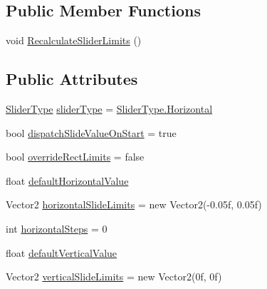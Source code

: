 \subsection*{Public Member Functions}
\begin{DoxyCompactItemize}
\item 
void \mbox{\hyperlink{class_leap_1_1_unity_1_1_interaction_1_1_interaction_slider_af984b10c1e7d956a61505d1294ab28e4}{Recalculate\+Slider\+Limits}} ()
\end{DoxyCompactItemize}
\subsection*{Public Attributes}
\begin{DoxyCompactItemize}
\item 
\mbox{\hyperlink{class_leap_1_1_unity_1_1_interaction_1_1_interaction_slider_ae3fefc578d521cc71c2ea5d222e01748}{Slider\+Type}} \mbox{\hyperlink{class_leap_1_1_unity_1_1_interaction_1_1_interaction_slider_a7d25fc4d3c00bacc32c01b4c55cac68b}{slider\+Type}} = \mbox{\hyperlink{class_leap_1_1_unity_1_1_interaction_1_1_interaction_slider_ae3fefc578d521cc71c2ea5d222e01748ac1b5fa03ecdb95d4a45dd1c40b02527f}{Slider\+Type.\+Horizontal}}
\item 
bool \mbox{\hyperlink{class_leap_1_1_unity_1_1_interaction_1_1_interaction_slider_ad03391d78ef10020b7e6242fa211f58b}{dispatch\+Slide\+Value\+On\+Start}} = true
\item 
bool \mbox{\hyperlink{class_leap_1_1_unity_1_1_interaction_1_1_interaction_slider_aba23eaca1c57c11c38d116d424ac5ff4}{override\+Rect\+Limits}} = false
\item 
float \mbox{\hyperlink{class_leap_1_1_unity_1_1_interaction_1_1_interaction_slider_abd18238605930c81a01de1cfa85b7928}{default\+Horizontal\+Value}}
\item 
Vector2 \mbox{\hyperlink{class_leap_1_1_unity_1_1_interaction_1_1_interaction_slider_aac876ee4286370ad7a186d10d0c75848}{horizontal\+Slide\+Limits}} = new Vector2(-\/0.\+05f, 0.\+05f)
\item 
int \mbox{\hyperlink{class_leap_1_1_unity_1_1_interaction_1_1_interaction_slider_a3d961fb69c6c913958da01b8aa9c4e04}{horizontal\+Steps}} = 0
\item 
float \mbox{\hyperlink{class_leap_1_1_unity_1_1_interaction_1_1_interaction_slider_a3ad496e9fb9d322fd79363bb6056c123}{default\+Vertical\+Value}}
\item 
Vector2 \mbox{\hyperlink{class_leap_1_1_unity_1_1_interaction_1_1_interaction_slider_a6f401163a50594104f9e9e54c473d5a0}{vertical\+Slide\+Limits}} = new Vector2(0f, 0f)

\end{DoxyCompactItemize}
